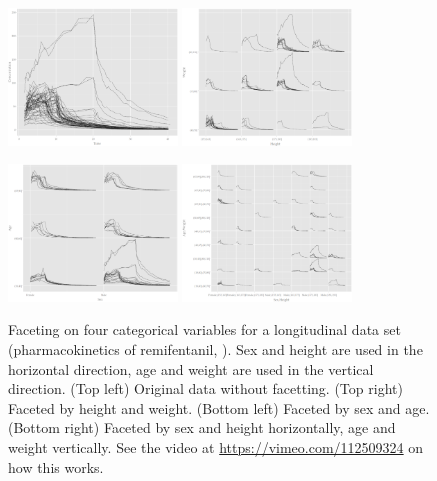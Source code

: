 \documentclass[12pt]{article}
\begin{document}
\begin{itemize}
\begin{center}
\begin{figure}[htp]
\begin{centering}
\includegraphics[width=0.4\textwidth]{graph/pipeline-25-1} \includegraphics[width=0.4\textwidth]{graph/pipeline-25-3}
\end{centering}
\begin{centering}
\includegraphics[width=0.4\textwidth]{graph/pipeline-25-2} \includegraphics[width=0.4\textwidth]{graph/pipeline-25-4}
\end{centering}

\caption{\label{fig:faceting-4ind}Faceting on four categorical variables for
a longitudinal data set  (pharmacokinetics of remifentanil, \citep{pinheiro2000mixed}).
Sex and height are used in the horizontal direction, age and weight
are used in the vertical direction.  (Top left) Original data without
facetting.  (Top right) Faceted by height and weight.  (Bottom left)
Faceted by sex and age.  (Bottom right) Faceted by sex and height
horizontally, age and weight vertically. See the video at \url{https://vimeo.com/112509324} on how this works.}
\end{figure}
\end{center}



\end{itemize}
\end{document}
